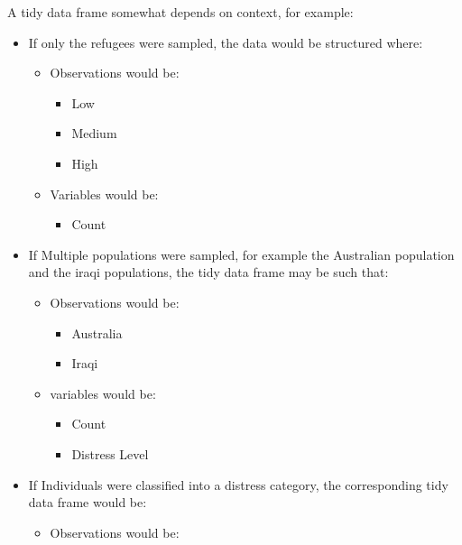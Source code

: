 \documentclass[
]{article}
\providecommand{\tightlist}{%
  \setlength{\itemsep}{0pt}\setlength{\parskip}{0pt}}
\begin{document}
A tidy data frame somewhat depends on context, for example:

\begin{itemize}
\tightlist
\item
  If only the refugees were sampled, the data would be structured where:

  \begin{itemize}
  \tightlist
  \item
    Observations would be:

    \begin{itemize}
    \tightlist
    \item
      Low
    \item
      Medium
    \item
      High
    \end{itemize}
  \item
    Variables would be:

    \begin{itemize}
    \tightlist
    \item
      Count
    \end{itemize}
  \end{itemize}
\item
  If Multiple populations were sampled, for example the Australian
  population and the iraqi populations, the tidy data frame may be such
  that:

  \begin{itemize}
  \tightlist
  \item
    Observations would be:

    \begin{itemize}
    \tightlist
    \item
      Australia
    \item
      Iraqi
    \end{itemize}
  \item
    variables would be:

    \begin{itemize}
    \tightlist
    \item
      Count
    \item
      Distress Level
    \end{itemize}
  \end{itemize}
\item
  If Individuals were classified into a distress category, the
  corresponding tidy data frame would be:

  \begin{itemize}
  \tightlist
  \item
    Observations would be:


\end{itemize}
\end{itemize}
\end{document}
